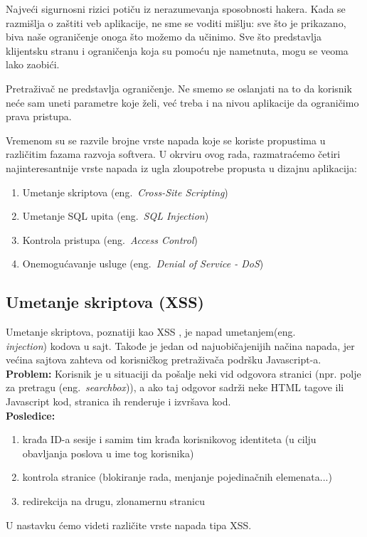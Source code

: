 \documentclass[a4paper]{article}
\begin{document}
Najveći sigurnosni rizici potiču iz nerazumevanja sposobnosti hakera. Kada se razmišlja o zaštiti veb aplikacije, ne sme se voditi mišlju: sve što je prikazano, biva naše ograničenje onoga što možemo da učinimo. Sve što predstavlja klijentsku stranu i ograničenja koja su pomoću nje nametnuta, mogu se veoma lako zaobići.

Pretraživač ne predstavlja ograničenje. Ne smemo se oslanjati na to da korisnik neće sam uneti parametre koje želi, već treba i na nivou aplikacije da ograničimo prava pristupa.

Vremenom su se razvile brojne vrste napada koje se koriste propustima u različitim fazama razvoja softvera. U okrviru ovog rada, razmatraćemo četiri najinteresantnije vrste napada iz ugla zloupotrebe propusta u dizajnu aplikacija:
\begin{enumerate}
	\item Umetanje skriptova (eng.~{\em Cross-Site Scripting})
	\item Umetanje SQL upita (eng.~{\em SQL Injection})
	\item Kontrola pristupa (eng.~{\em Access Control})
	\item Onemogućavanje usluge (eng.~{\em Denial of Service - DoS})
\end{enumerate}
\subsection{Umetanje skriptova (XSS)}
Umetanje skriptova, poznatiji kao XSS \cite{XSS}, je napad umetanjem(eng.~{\em \\injection}) kodova u sajt. Takođe je jedan od najuobičajenijih načina napada, jer većina sajtova zahteva od korisničkog pretraživača podršku Javascript-a.\\
\textbf{Problem:} Korisnik je u situaciji da pošalje neki vid odgovora stranici (npr. polje za pretragu (eng.~{\em searchbox})), a ako taj odgovor sadrži neke HTML tagove ili Javascript kod, stranica ih renderuje i izvršava kod.\\
\textbf{Posledice:}
\begin{enumerate}
	\item krađa ID-a sesije i samim tim krađa korisnikovog identiteta (u cilju obavljanja poslova u ime tog korisnika)
	\item kontrola stranice (blokiranje rada, menjanje pojedinačnih elemenata...)
	\item redirekcija na drugu, zlonamernu stranicu
\end{enumerate}
U nastavku ćemo videti različite vrste napada tipa XSS.
\end{document}
